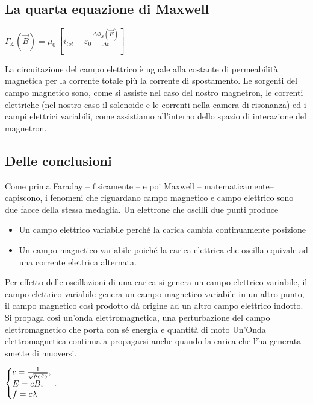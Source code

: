 \documentclass{article}
\begin{document}
\subsection{La quarta equazione di Maxwell}
\begin{center}
$\Gamma_{\mathcal{L}}(\overrightarrow{B}) = \mu_0 \ [i_{tot}+ \varepsilon_0 \frac{\Delta \Phi_{S}(\overrightarrow{E})}{\Delta t}]$
\end{center} 
La circuitazione del campo elettrico è uguale alla costante di permeabilità magnetica per la corrente totale più la corrente di spostamento. Le  sorgenti del campo magnetico sono, come si assiste nel caso del nostro magnetron, le correnti elettriche (nel nostro caso il solenoide e le correnti nella camera di risonanza) ed i campi elettrici variabili, come assistiamo all'interno dello spazio di interazione del magnetron. 

\subsection{Delle conclusioni }
Come prima Faraday – fisicamente –  e poi Maxwell – matematicamente– capiscono, i fenomeni che riguardano campo magnetico e campo elettrico sono due facce della stessa medaglia. 
Un elettrone che oscilli due punti produce
\begin{itemize}[noitemsep]
\item Un campo elettrico variabile perché la carica cambia continuamente posizione 
\item Un campo magnetico variabile poiché la carica elettrica che oscilla equivale ad una corrente elettrica alternata.
\end{itemize}
Per effetto delle oscillazioni di una carica si genera un campo elettrico variabile, il campo elettrico variabile genera un campo magnetico variabile in un altro punto, il campo magnetico così prodotto dà origine ad un altro campo  elettrico indotto. Si propaga così un'onda elettromagnetica, una perturbazione del campo elettromagnetico che porta con sé energia e quantità di moto 
Un'Onda elettromagnetica continua a propagarsi anche quando la carica che l'ha generata smette di muoversi. \\
\begin{center}
$
\left\{\begin{array}{@{}l@{}}
   		c = \frac{1}{\sqrt{\mu_0 \varepsilon_0}}, \\
      E = cB , \\
      f = c \lambda
  \end{array}\right.\,.
$
\end{center}
\end{document}
